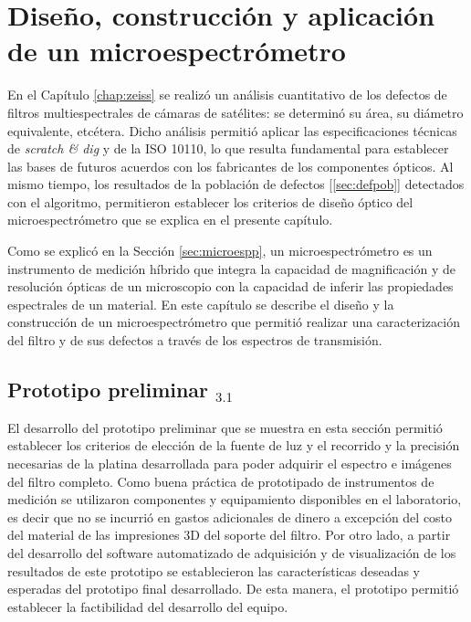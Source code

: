 \singlespacing
\chapter{Diseño, construcción y aplicación de un microespectrómetro}
\label{chap:microsp}

\hspace{0.5cm}En el Capítulo \ref{chap:zeiss} se realizó un análisis cuantitativo de los defectos de filtros multiespectrales de cámaras de satélites: se determinó su área, su diámetro equivalente, etcétera. Dicho análisis permitió aplicar las especificaciones técnicas de \textit{scratch \& dig} y de la ISO 10110, lo que resulta fundamental para establecer las bases de futuros acuerdos con los fabricantes de los componentes ópticos. Al mismo tiempo, los resultados de la población de defectos [\ref{sec:defpob}] detectados con el algoritmo, permitieron establecer los criterios de diseño óptico del microespectrómetro que se explica en el presente capítulo.

Como se explicó en la Sección \ref{sec:microespp}, un microespectrómetro es un instrumento de medición híbrido que integra la capacidad de magnificación y de resolución ópticas de un microscopio con la capacidad de inferir las propiedades espectrales de un material. En este capítulo se describe el diseño y la construcción de un microespectrómetro que permitió realizar una caracterización del filtro y de sus defectos a través de los espectros de transmisión.

\singlespacing
\section{Prototipo preliminar \href{https://github.com/jrr1984/Prototipo0\_S-D\_SpectralGUI}{\faGithub$_{3.1}$}}
\label{sec:prot0}

\hspace{0.5cm}El desarrollo del prototipo preliminar que se muestra en esta sección permitió establecer los criterios de elección de la fuente de luz y el recorrido y la precisión necesarias de la platina desarrollada para poder adquirir el espectro e imágenes del filtro completo. Como buena práctica de prototipado de instrumentos de medición se utilizaron componentes y equipamiento disponibles en el laboratorio, es decir que no se incurrió en gastos adicionales de dinero a excepción del costo del material de las impresiones 3D del soporte del filtro. Por otro lado, a partir del desarrollo del software automatizado de adquisición y de visualización de los resultados de este prototipo se establecieron las características deseadas y esperadas del prototipo final desarrollado. De esta manera, el prototipo permitió establecer la factibilidad del desarrollo del equipo.

